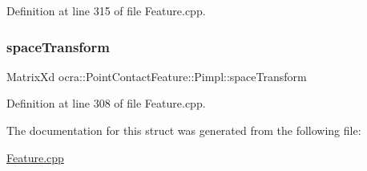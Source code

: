 Definition at line 315 of file Feature.\+cpp.

\hypertarget{structocra_1_1PointContactFeature_1_1Pimpl_a2636a91b8abaabb52ac34a4121e9e115}{}\label{structocra_1_1PointContactFeature_1_1Pimpl_a2636a91b8abaabb52ac34a4121e9e115} 
\subsubsection{\texorpdfstring{space\+Transform}{spaceTransform}}
{\footnotesize\ttfamily Matrix\+Xd ocra\+::\+Point\+Contact\+Feature\+::\+Pimpl\+::space\+Transform}



Definition at line 308 of file Feature.\+cpp.



The documentation for this struct was generated from the following file\+:\begin{DoxyCompactItemize}
\item 
\hyperlink{Feature_8cpp}{Feature.\+cpp}\end{DoxyCompactItemize}
